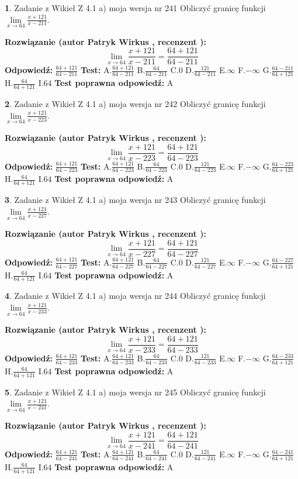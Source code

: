 \documentclass[12pt, a4paper]{article}
\theoremstyle{definition} %
\newtheorem{zad}{}
\newcommand{\zadStart}[1]{\begin{zad}#1\newline}
\newcommand{\zadStop}{\end{zad}}
\newcommand{\rozwStart}[2]{\noindent \textbf{Rozwiązanie (autor #1 , recenzent #2): }\newline}
\newcommand{\rozwStop}{\newline}
\newcommand{\odpStart}{\noindent \textbf{Odpowiedź:}\newline}
\newcommand{\odpStop}{\newline}
\newcommand{\testStart}{\noindent \textbf{Test:}\newline}
\newcommand{\testStop}{\newline}
\newcommand{\kluczStart}{\noindent \textbf{Test poprawna odpowiedź:}\newline}
\newcommand{\kluczStop}{\newline}
\begin{document}
\zadStart{Zadanie z Wikieł Z 4.1 a) moja wersja nr 241}
Obliczyć granicę funkcji $\lim\limits_{x\to64}\frac{x+121}{x-211}$.
\zadStop
\rozwStart{Patryk Wirkus}{}
$$\lim\limits_{x\to64}\frac{x+121}{x-211} = \frac{64+121}{64-211}$$
\rozwStop
\odpStart
$\frac{64+121}{64-211}$
\odpStop
\testStart
A.$\frac{64+121}{64-211}$
B.$\frac{64}{64-211}$
C.$0$
D.$\frac{121}{64-211}$
E.$\infty$
F.$-\infty$
G.$\frac{64-211}{64+121}$
H.$\frac{64}{64+121}$
I.$64$
\testStop
\kluczStart
A
\kluczStop



\zadStart{Zadanie z Wikieł Z 4.1 a) moja wersja nr 242}
Obliczyć granicę funkcji $\lim\limits_{x\to64}\frac{x+121}{x-223}$.
\zadStop
\rozwStart{Patryk Wirkus}{}
$$\lim\limits_{x\to64}\frac{x+121}{x-223} = \frac{64+121}{64-223}$$
\rozwStop
\odpStart
$\frac{64+121}{64-223}$
\odpStop
\testStart
A.$\frac{64+121}{64-223}$
B.$\frac{64}{64-223}$
C.$0$
D.$\frac{121}{64-223}$
E.$\infty$
F.$-\infty$
G.$\frac{64-223}{64+121}$
H.$\frac{64}{64+121}$
I.$64$
\testStop
\kluczStart
A
\kluczStop



\zadStart{Zadanie z Wikieł Z 4.1 a) moja wersja nr 243}
Obliczyć granicę funkcji $\lim\limits_{x\to64}\frac{x+121}{x-227}$.
\zadStop
\rozwStart{Patryk Wirkus}{}
$$\lim\limits_{x\to64}\frac{x+121}{x-227} = \frac{64+121}{64-227}$$
\rozwStop
\odpStart
$\frac{64+121}{64-227}$
\odpStop
\testStart
A.$\frac{64+121}{64-227}$
B.$\frac{64}{64-227}$
C.$0$
D.$\frac{121}{64-227}$
E.$\infty$
F.$-\infty$
G.$\frac{64-227}{64+121}$
H.$\frac{64}{64+121}$
I.$64$
\testStop
\kluczStart
A
\kluczStop



\zadStart{Zadanie z Wikieł Z 4.1 a) moja wersja nr 244}
Obliczyć granicę funkcji $\lim\limits_{x\to64}\frac{x+121}{x-233}$.
\zadStop
\rozwStart{Patryk Wirkus}{}
$$\lim\limits_{x\to64}\frac{x+121}{x-233} = \frac{64+121}{64-233}$$
\rozwStop
\odpStart
$\frac{64+121}{64-233}$
\odpStop
\testStart
A.$\frac{64+121}{64-233}$
B.$\frac{64}{64-233}$
C.$0$
D.$\frac{121}{64-233}$
E.$\infty$
F.$-\infty$
G.$\frac{64-233}{64+121}$
H.$\frac{64}{64+121}$
I.$64$
\testStop
\kluczStart
A
\kluczStop



\zadStart{Zadanie z Wikieł Z 4.1 a) moja wersja nr 245}
Obliczyć granicę funkcji $\lim\limits_{x\to64}\frac{x+121}{x-241}$.
\zadStop
\rozwStart{Patryk Wirkus}{}
$$\lim\limits_{x\to64}\frac{x+121}{x-241} = \frac{64+121}{64-241}$$
\rozwStop
\odpStart
$\frac{64+121}{64-241}$
\odpStop
\testStart
A.$\frac{64+121}{64-241}$
B.$\frac{64}{64-241}$
C.$0$
D.$\frac{121}{64-241}$
E.$\infty$
F.$-\infty$
G.$\frac{64-241}{64+121}$
H.$\frac{64}{64+121}$
I.$64$
\testStop
\kluczStart
A
\kluczStop
\end{document}
